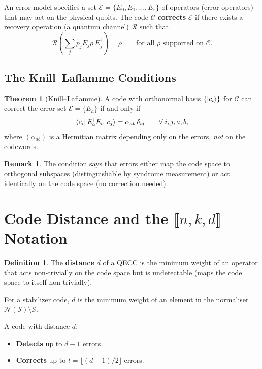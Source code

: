 \documentclass[11pt]{article}
\theoremstyle{definition}
\newtheorem{definition}{Definition}[section]
\newtheorem{remark}{Remark}[section]
\newtheorem{theorem}{Theorem}[section]
\begin{document}
An error model specifies a set $\mathcal{E}=\{E_0,E_1,\dots,E_r\}$ of operators (error operators) that may act on the physical qubits.  The code $\mathcal{C}$ \textbf{corrects} $\mathcal{E}$ if there exists a recovery operation (a quantum channel) $\mathcal{R}$ such that
\[
    \mathcal{R}\!\left(\sum_j p_j E_j\rho\,E_j^\dagger\right) = \rho
    \qquad\text{for all } \rho \text{ supported on } \mathcal{C}.
\]

\subsection{The Knill--Laflamme Conditions}

\begin{theorem}[Knill--Laflamme]
A code with orthonormal basis $\{\ket{c_i}\}$ for $\mathcal{C}$ can correct the error set $\mathcal{E}=\{E_a\}$ if and only if
\[
    \bra{c_i}E_a^\dagger E_b\ket{c_j} = \alpha_{ab}\,\delta_{ij}
    \qquad\forall\;i,j,a,b,
\]
where $(\alpha_{ab})$ is a Hermitian matrix depending only on the errors, \emph{not} on the codewords.
\end{theorem}

\begin{remark}
The condition says that errors either map the code space to orthogonal subspaces (distinguishable by syndrome measurement) or act identically on the code space (no correction needed).
\end{remark}

\section{Code Distance and the $\llbracket n,k,d\rrbracket$ Notation}

\begin{definition}
The \textbf{distance} $d$ of a QECC is the minimum weight of an operator that acts non-trivially on the code space but is undetectable (maps the code space to itself non-trivially).

For a stabilizer code, $d$ is the minimum weight of an element in the normaliser $\mathcal{N}(\mathcal{S})\setminus\mathcal{S}$.
\end{definition}

A code with distance $d$:
\begin{itemize}
    \item \textbf{Detects} up to $d-1$ errors.
    \item \textbf{Corrects} up to $t=\lfloor(d-1)/2\rfloor$ errors.
\end{itemize}
\end{document}
